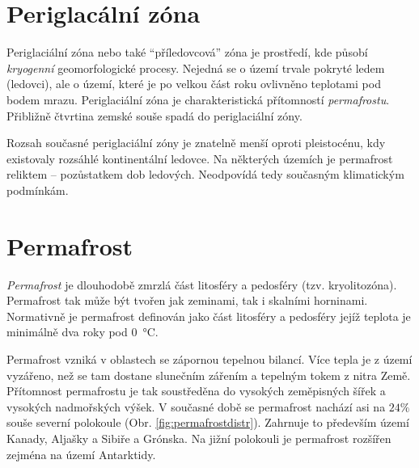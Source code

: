 \section{Periglacální zóna}
Periglaciální zóna nebo také \enquote{příledovcová} zóna je prostředí, kde působí \emph{kryogenní} geomorfologické procesy. Nejedná se o území trvale pokryté ledem (ledovci), ale o území, které je po velkou část roku ovlivněno teplotami pod bodem mrazu. Periglaciální zóna je charakteristická přítomností \emph{permafrostu}. Přibližně čtvrtina zemské souše spadá do periglaciální zóny. 

Rozsah současné periglaciální zóny je znatelně menší oproti pleistocénu, kdy existovaly rozsáhlé kontinentální ledovce. Na některých územích je permafrost reliktem -- pozůstatkem dob ledových. Neodpovídá tedy současným klimatickým podmínkám. 

\section{Permafrost}
\emph{Permafrost} je dlouhodobě zmrzlá část litosféry a pedosféry (tzv. kryolitozóna). Permafrost tak může být tvořen jak zeminami, tak i skalními horninami. Normativně je permafrost definován jako část litosféry a pedosféry jejíž teplota je minimálně dva roky pod \SI{0}{\degreeCelsius}. 

Permafrost vzniká v oblastech se zápornou tepelnou bilancí. Více tepla je z území vyzářeno, než se tam dostane slunečním zářením a tepelným tokem z nitra Země. Přítomnost permafrostu je tak soustředěna do vysokých zeměpisných šířek a vysokých nadmořských výšek. V současné době se permafrost nachází asi na $24 \%$ souše severní polokoule (Obr. \ref{fig:permafrostdistr}). Zahrnuje to především území Kanady, Aljašky a Sibiře a Grónska. Na jižní polokouli je permafrost rozšířen zejména na území Antarktidy.

